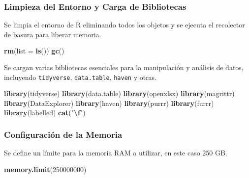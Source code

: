 \documentclass[
  12pt,
]{book}
\newenvironment{Shaded}{\begin{snugshade}}{\end{snugshade}}
\newcommand{\AttributeTok}[1]{\textcolor[rgb]{0.13,0.29,0.53}{#1}}
\newcommand{\DecValTok}[1]{\textcolor[rgb]{0.00,0.00,0.81}{#1}}
\newcommand{\FunctionTok}[1]{\textcolor[rgb]{0.13,0.29,0.53}{\textbf{#1}}}
\newcommand{\NormalTok}[1]{#1}
\newcommand{\SpecialCharTok}[1]{\textcolor[rgb]{0.81,0.36,0.00}{\textbf{#1}}}
\newcommand{\StringTok}[1]{\textcolor[rgb]{0.31,0.60,0.02}{#1}}
\begin{document}
\hypertarget{limpieza-del-entorno-y-carga-de-bibliotecas}{%
\subsubsection*{Limpieza del Entorno y Carga de Bibliotecas}\label{limpieza-del-entorno-y-carga-de-bibliotecas}}

Se limpia el entorno de R eliminando todos los objetos y se ejecuta el recolector de basura para liberar memoria.

\begin{Shaded}
\begin{Highlighting}[]
\FunctionTok{rm}\NormalTok{(}\AttributeTok{list =} \FunctionTok{ls}\NormalTok{())}
\FunctionTok{gc}\NormalTok{()}
\end{Highlighting}
\end{Shaded}

Se cargan varias bibliotecas esenciales para la manipulación y análisis de datos, incluyendo \texttt{tidyverse}, \texttt{data.table}, \texttt{haven} y otras.

\begin{Shaded}
\begin{Highlighting}[]
\FunctionTok{library}\NormalTok{(tidyverse)}
\FunctionTok{library}\NormalTok{(data.table)}
\FunctionTok{library}\NormalTok{(openxlsx)}
\FunctionTok{library}\NormalTok{(magrittr)}
\FunctionTok{library}\NormalTok{(DataExplorer)}
\FunctionTok{library}\NormalTok{(haven)}
\FunctionTok{library}\NormalTok{(purrr)}
\FunctionTok{library}\NormalTok{(furrr)}
\FunctionTok{library}\NormalTok{(labelled)}
\FunctionTok{cat}\NormalTok{(}\StringTok{"}\SpecialCharTok{\textbackslash{}f}\StringTok{"}\NormalTok{)}
\end{Highlighting}
\end{Shaded}

\hypertarget{configuraciuxf3n-de-la-memoria}{%
\subsubsection*{Configuración de la Memoria}\label{configuraciuxf3n-de-la-memoria}}

Se define un límite para la memoria RAM a utilizar, en este caso 250 GB.

\begin{Shaded}
\begin{Highlighting}[]
\FunctionTok{memory.limit}\NormalTok{(}\DecValTok{250000000}\NormalTok{)}
\end{Highlighting}
\end{Shaded}
\end{document}
